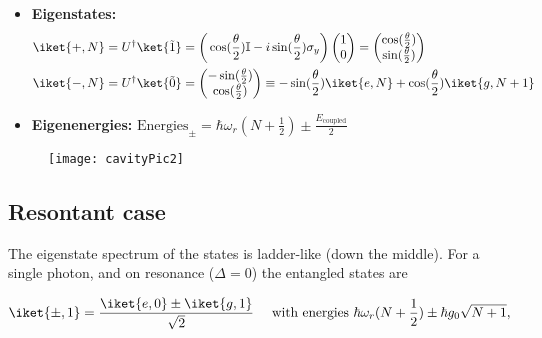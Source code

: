 \begin{enumerate}
\begin{framed}
    \begin{itemize}
    \item \textbf{Eigenstates:}
      \[
        \begin{aligned}
          \iket{+,N}        &        =        U^{\dagger}\ket{\tilde{1}}        =
          \bigg(\cos(\frac{\theta}{2})\mathbb{I}-i\sin(\frac{\theta}{2})\sigma_y\bigg)
          \begin{pmatrix}1\\0 \end{pmatrix} =
          \begin{pmatrix} \cos(\frac{\theta}{2})\\\sin(\frac{\theta}{2})\end{pmatrix} \\
          \iket{-,N}   &    =   U^{\dagger}\ket{\tilde{0}}    =   \begin{pmatrix}
            -\sin(\frac{\theta}{2})\\\cos(\frac{\theta}{2})
          \end{pmatrix} \equiv -\sin(\frac{\theta}{2})\iket{e,N} + \cos(\frac{\theta}{2})\iket{g,N+1}\\
        \end{aligned}
      \]
    \item                      \textbf{Eigenenergies:}                     \hfill
      $     \text{Energies}_{\pm}      =     \hbar\omega_r(N+\frac{1}{2})     \pm
      \frac{E_\text{coupled}}{2} $
    \end{itemize}
  \end{framed}

\end{enumerate}

\begin{figure}[h]
  \centering \texttt{[image: cavityPic2]}
\end{figure}

\subsection{Resontant case}
\label{sec:resontant-case}



\noindent The eigenstate spectrum of the  states is ladder-like (down
the  middle).  For  a  single photon,  and  on resonance  ($ \Delta  =  0 $)  the
entangled states are

 \[
   \iket{\pm,1} =  \frac{\iket{e,0} \pm  \iket{g,1}}{\sqrt{2}} \quad  \text{ with
     energies } \hbar\omega_r(N+\frac{1}{2}) \pm \hbar g_0\sqrt{N+1},
 \]

